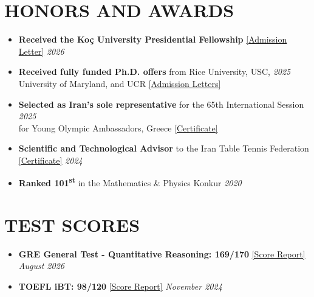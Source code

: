\documentclass[11pt,a4paper,roman]{moderncv}        %
\begin{document}
   \section{HONORS AND AWARDS}
    \begin{itemize}

  \item \textbf{Received the Koç University Presidential Fellowship} \href{https://drive.google.com/file/d/1rkdy2vpEiPgnRiy27K1r-oGOvryMR9RN/view?usp=share_link}{\textcolor{blue link}{[Admission Letter]}} \hfill{\emph{2026}}

  \item \textbf{Received fully funded Ph.D. offers} from Rice University, USC, \hfill{\emph{2025}}
  \\ University of Maryland, and UCR \href{https://drive.google.com/file/d/1xA8P6UmR1mZA5xhIvorusELynFsfog_T/view?usp=share_link}{\textcolor{blue link}{[Admission Letters]}}

  \item \textbf{Selected as Iran’s sole representative} for the 65th International Session \hfill{\emph{2025}} 
  \\ for Young Olympic Ambassadors, Greece \href{https://drive.google.com/file/d/1n3MH0inR40NyIY-3ZBGMOi-WiV5PeBEU/view?usp=share_link}{\textcolor{blue link}{[Certificate]}}

    \item \textbf{Scientific and Technological Advisor} to the Iran Table Tennis Federation \href{https://drive.google.com/file/d/1CMkVGN-WpmE1n3HIoA9wU2QhI6EbFbGZ/view?usp=share_link}{\textcolor{blue link}{[Certificate]}} \hfill{\emph{2024}}

\item \textbf{Ranked 101\textsuperscript{st}} in the Mathematics \& Physics Konkur \hfill{\emph{2020}}

  \end{itemize}

    \section{TEST SCORES}
    \begin{itemize}
        \item \textbf{GRE General Test - Quantitative Reasoning: 169/170} \href{https://drive.google.com/file/d/1pfSaGtpdD4dJlSVIpj4tE2wNAwVNb2Hh/view?usp=share_link}{\textcolor{blue link}{[Score Report]}} \hfill{\emph{August 2026}}
        \item \textbf{TOEFL iBT: 98/120} \href{https://drive.google.com/file/d/1Cp73BgpDKzT5YzgmjRD0sJvaR9VQL8JG/view?usp=share_link}{\textcolor{blue link}{[Score Report]}} \hfill{\emph{November 2024}}
    \end{itemize}
        
\end{document}
